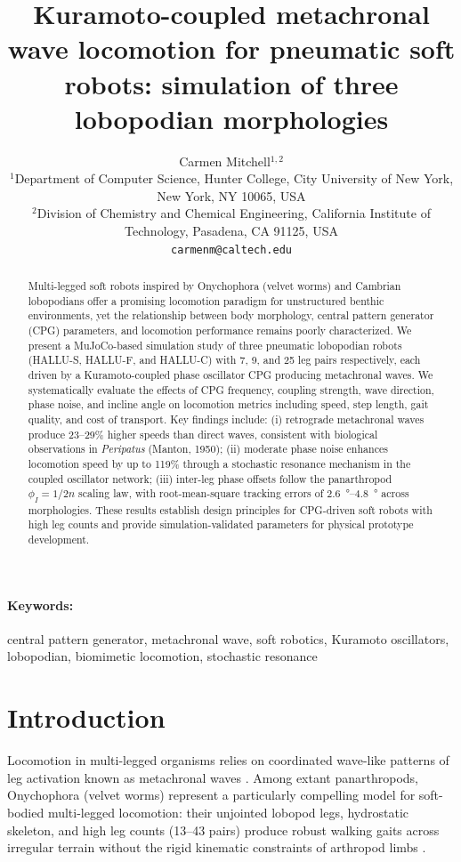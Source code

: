 \documentclass[12pt]{article}
\title{Kuramoto-coupled metachronal wave locomotion for pneumatic soft robots:
       simulation of three lobopodian morphologies}
\author{Carmen Mitchell$^{1,2}$\\
\small $^1$Department of Computer Science, Hunter College,
City University of New York, New York, NY 10065, USA\\
\small $^2$Division of Chemistry and Chemical Engineering,
California Institute of Technology, Pasadena, CA 91125, USA\\
\small \texttt{carmenm@caltech.edu}}
\date{}
\begin{document}
\maketitle

\begin{abstract}
Multi-legged soft robots inspired by Onychophora (velvet worms) and
Cambrian lobopodians offer a promising locomotion paradigm for unstructured
benthic environments, yet the relationship between body morphology,
central pattern generator (CPG) parameters, and locomotion performance
remains poorly characterized.
We present a MuJoCo-based simulation study of three pneumatic lobopodian
robots (HALLU-S, HALLU-F, and HALLU-C) with 7, 9, and 25 leg pairs
respectively, each driven by a Kuramoto-coupled phase oscillator CPG
producing metachronal waves.
We systematically evaluate the effects of CPG frequency, coupling
strength, wave direction, phase noise, and incline angle on locomotion
metrics including speed, step length, gait quality, and cost of transport.
Key findings include: (i) retrograde metachronal waves produce 23--29\%
higher speeds than direct waves, consistent with biological observations
in \textit{Peripatus} (Manton, 1950);
(ii) moderate phase noise enhances locomotion speed by up to 119\%
through a stochastic resonance mechanism in the coupled oscillator
network;
(iii) inter-leg phase offsets follow the panarthropod $\phi_I = 1/2n$
scaling law, with root-mean-square tracking errors of
\SIrange{2.6}{4.8}{\degree} across morphologies.
These results establish design principles for CPG-driven soft robots
with high leg counts and provide simulation-validated parameters for
physical prototype development.
\end{abstract}

\paragraph{Keywords:} central pattern generator, metachronal wave,
soft robotics, Kuramoto oscillators, lobopodian, biomimetic locomotion,
stochastic resonance

\section{Introduction}
\label{sec:intro}

Locomotion in multi-legged organisms relies on coordinated wave-like
patterns of leg activation known as metachronal waves
\citep{manton1950locomotory, manton1952evolution}.
Among extant panarthropods, Onychophora (velvet worms) represent a
particularly compelling model for soft-bodied multi-legged locomotion:
their unjointed lobopod legs, hydrostatic skeleton, and high leg counts
(13--43 pairs) produce robust walking gaits across irregular terrain
without the rigid kinematic constraints of arthropod limbs
\citep{oliveira2019functional, nirody2021universal}.
\end{document}
